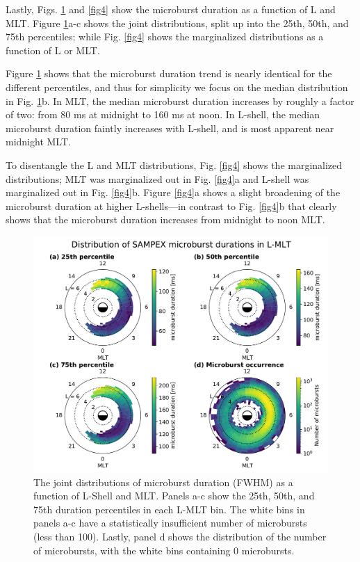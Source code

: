 \documentclass[draft]{agujournal2019}
\begin{document}
Lastly, Figs. \ref{fig3} and \ref{fig4} show the microburst duration as a function of L and MLT. Figure \ref{fig3}a-c shows the joint distributions, split up into the 25th, 50th, and 75th percentiles; while Fig. \ref{fig4} shows the marginalized distributions as a function of L or MLT.

Figure \ref{fig3} shows that the microburst duration trend is nearly identical for the different percentiles, and thus for simplicity we focus on the median distribution in Fig. \ref{fig3}b. In MLT, the median microburst duration increases by roughly a factor of two: from 80 ms at midnight to 160 ms at noon. In L-shell, the median microburst duration faintly increases with L-shell, and is most apparent near midnight MLT.

To disentangle the L and MLT distributions, Fig. \ref{fig4} shows the marginalized distributions; MLT was marginalized out in Fig. \ref{fig4}a and L-shell was marginalized out in Fig. \ref{fig4}b. Figure \ref{fig4}a shows a slight broadening of the microburst duration at higher L-shells---in contrast to Fig. \ref{fig4}b that clearly shows that the microburst duration increases from midnight to noon MLT.

\begin{figure}
\noindent\includegraphics[width=\textwidth]{figures/fig3.pdf}
\caption{The joint distributions of microburst duration (FWHM) as a function of L-Shell and MLT. Panels a-c show the 25th, 50th, and 75th duration percentiles in each L-MLT bin. The white bins in panels a-c have a statistically insufficient number of microbursts (less than 100). Lastly, panel d shows the distribution of the number of microbursts, with the white bins containing 0 microbursts.}
\label{fig3}
\end{figure}
\end{document}
